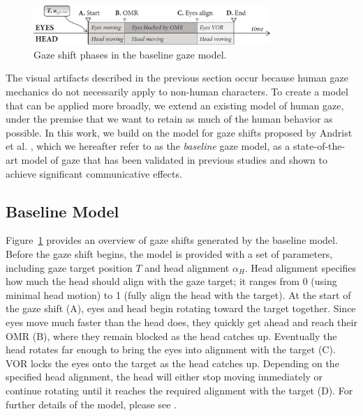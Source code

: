 \begin{figure}[t]
\centering
\vspace{2pt}
\includegraphics[width=0.8\textwidth]{Figures/AndristGazeModel.pdf}
\caption{Gaze shift phases in the baseline gaze model.}
\vspace{-10pt}
\label{fig:AndristGazeModel}
\end{figure}

The visual artifacts described in the previous section occur because human gaze mechanics do not necessarily apply to non-human characters. To create a model that can be applied more broadly, we extend an existing model of human gaze, under the premise that we want to retain as much of the human behavior as possible. In this work, we build on the model for gaze shifts proposed by Andrist et al. \cite{andrist2012headeye}, which we hereafter refer to as the \textit{baseline} gaze model, as a state-of-the-art model of gaze that has been validated in previous studies \cite{andrist2012headeye,andrist2012designing} and shown to achieve significant communicative effects.

\subsection{Baseline Model}
\label{sec:baseline}
Figure~\ref{fig:AndristGazeModel} provides an overview of gaze shifts generated by the baseline model. Before the gaze shift begins, the model is provided with a set of parameters, including gaze target position $T$ and head alignment $\alpha_H$. Head alignment specifies how much the head should align with the gaze target; it ranges from 0 (using minimal head motion) to 1 (fully align the head with the target). At the start of the gaze shift (A), eyes and head begin rotating toward the target together. Since eyes move much faster than the head does, they quickly get ahead and reach their OMR (B), where they remain blocked as the head catches up. Eventually the head rotates far enough to bring the eyes into alignment with the target (C). VOR locks the eyes onto the target as the head catches up. Depending on the specified head alignment, the head will either stop moving immediately or continue rotating until it reaches the required alignment with the target (D). For further details of the model, please see \cite{andrist2012headeye}.


